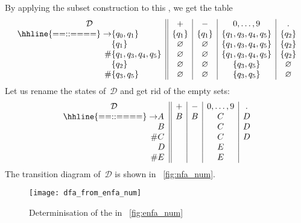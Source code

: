 By applying the subset construction to this \eNFA, we get the table
\begin{equation*}
\begin{array}{r@{}l||c|c|c|c}
\multicolumn{2}{c||}{\mathcal{D}} & + & - & 0, \ldots, 9 & \mathtt{.}\\
\hhline{==::====}
\rightarrow 
   & \{q_0,q_1\} 
             & \{q_1\} & \{q_1\} & \{q_1, q_3, q_4, q_5\} & \{q_2\}\\
   & \{q_1\} & \varnothing  & \varnothing & \{q_1, q_3, q_4, q_5\} 
             & \{q_2\}\\
\# & \{q_1, q_3, q_4, q_5\} 
             & \varnothing  & \varnothing & \{q_1, q_3, q_4, q_5\} 
             & \{q_2\}\\
   & \{q_2\} & \varnothing & \varnothing & \{q_3, q_5\} & \varnothing\\
\# & \{q_3, q_5\}
             & \varnothing & \varnothing & \{q_3, q_5\} & \varnothing
\end{array}
\end{equation*}
Let us rename the states of~\(\mathcal{D}\) and get rid of the empty
sets:
\begin{equation*}
\begin{array}{r@{}l||c|c|c|c}
\multicolumn{2}{c||}{\mathcal{D}} & + & - & 0, \ldots, 9 & \mathtt{.}\\
\hhline{==::====}
\rightarrow 
   & A & B & B & C & D\\
   & B &   &   & C & D\\
\# & C &   &   & C & D\\
   & D &   &   & E &\\
\# & E &   &   & E &
\end{array}
\end{equation*}
The transition diagram of~\(\mathcal{D}\) is shown in
\fig~\vref{fig:nfa_num}.
\begin{figure}[H]
\centering
\texttt{[image: dfa\_from\_enfa\_num]}
\caption{Determinisation of the \eNFA in \fig~\vref{fig:enfa_num}
\label{fig:nfa_num}}
\end{figure}
